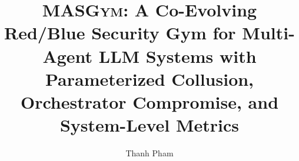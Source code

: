 \newcommand{\R}{\mathbb{R}}
\newcommand{\N}{\mathbb{N}}
\newcommand{\E}{\mathbb{E}}
\newcommand{\Prob}{\mathbb{P}}
\newcommand{\indic}{\mathbb{1}}
\newcommand{\Agents}{\mathcal{A}}          %
\newcommand{\Roles}{\mathcal{R}}           %
\newcommand{\Gtop}{\mathcal{G}}            %
\newcommand{\Vtop}{\mathcal{V}}
\newcommand{\Etop}{\mathcal{E}}
\newcommand{\Nin}{\mathcal{N}^{-}}          %
\newcommand{\Trace}{\tau}                  %
\newcommand{\TraceSp}{\mathcal{T}}         %
\newcommand{\Statesp}{\mathcal{S}}         %
\newcommand{\Predsec}{\Phi}                %
\newcommand{\Predutil}{\Psi}               %
\newcommand{\Checker}{\mathsf{C}}          %
\newcommand{\Emu}{\mathcal{E}_{\mathrm{LM}}} %
\newcommand{\Judge}{\mathsf{J}}            %
\newcommand{\Advset}{\mathcal{B}}          %
\newcommand{\betafrac}{\beta}              %
\newcommand{\config}{c}                    %
\newcommand{\Configs}{\mathcal{C}}         %
\newcommand{\ASRs}{\mathrm{ASR}_{\mathrm{sys}}}
\newcommand{\ASRa}{\mathrm{ASR}_{\mathrm{act}}}
\newcommand{\PNAs}{\mathrm{PNA}_{\mathrm{sys}}}
\newcommand{\NRPs}{\mathrm{NRP}_{\mathrm{sys}}}
\newcommand{\CPR}{\mathrm{CPR}}            %
\newcommand{\CSR}{\mathrm{CSR}}            %
\newcommand{\red}{\rho}                    %
\newcommand{\blue}{\delta}                 %
\newcommand{\pinf}{p}                      %
\newcommand{\thresh}{\theta}               %
\newcommand{\kappaem}{\kappa}              %
\newcommand{\defname}{\textsc{MASGym}\xspace}
\newcommand{\corb}{\textsc{CoRB}\xspace}

\title[MASGym: A Security Gym for Multi-Agent LLM Systems]{\defname: A
Co-Evolving Red/Blue Security Gym for Multi-Agent LLM Systems with
Parameterized Collusion, Orchestrator Compromise, and System-Level Metrics}

\author{Thanh Pham}


